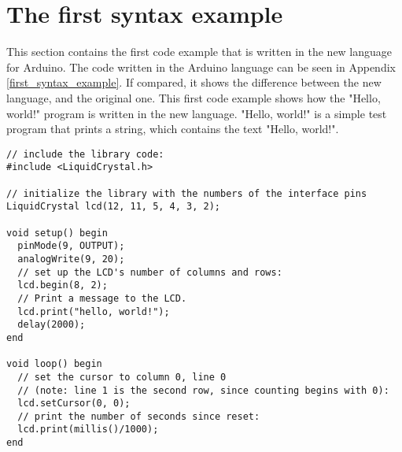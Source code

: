 \section{The first syntax example}\label{sec:code_examples}
This section contains the first code example that is written in the new language for Arduino. The code written in the Arduino language can be seen in Appendix \ref{first_syntax_example}. If compared, it shows the difference between the new language, and the original one. This first code example shows how the "Hello, world!" program is written in the new language. "Hello, world!" is a simple test program that prints a string, which contains the text "Hello, world!".
 
\begin{lstlisting}[caption=Hello World code example based on the source language, label=lst:syntax1]
// include the library code:
#include <LiquidCrystal.h>

// initialize the library with the numbers of the interface pins
LiquidCrystal lcd(12, 11, 5, 4, 3, 2);

void setup() begin
  pinMode(9, OUTPUT);
  analogWrite(9, 20);
  // set up the LCD's number of columns and rows: 
  lcd.begin(8, 2);
  // Print a message to the LCD.
  lcd.print("hello, world!");
  delay(2000);
end

void loop() begin
  // set the cursor to column 0, line 0
  // (note: line 1 is the second row, since counting begins with 0):
  lcd.setCursor(0, 0);
  // print the number of seconds since reset:
  lcd.print(millis()/1000);
end
\end{lstlisting}
